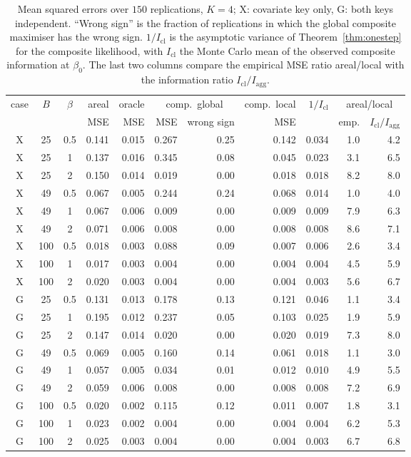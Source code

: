 \documentclass[11pt]{article}
\theoremstyle{definition}
\newcommand{\agg}{\mathrm{agg}}
\begin{document}
\begin{table}[t]\centering\footnotesize
\begin{tabular}{ccc rrr rr r rr}\toprule
case & $B$ & $\beta$ & areal & oracle & \multicolumn{2}{c}{comp.\ global} & comp.\ local & $1/I_{\mathrm{cl}}$ & \multicolumn{2}{c}{areal/local}\\
 & & & MSE & MSE & MSE & wrong sign & MSE & & emp. & $I_{\mathrm{cl}}/I_\agg$\\\midrule
X & 25 & 0.5 & 0.141 & 0.015 & 0.267 & 0.25 & 0.142 & 0.034 & 1.0 & 4.2\\
X & 25 & 1   & 0.137 & 0.016 & 0.345 & 0.08 & 0.045 & 0.023 & 3.1 & 6.5\\
X & 25 & 2   & 0.150 & 0.014 & 0.019 & 0.00 & 0.018 & 0.018 & 8.2 & 8.0\\
X & 49 & 0.5 & 0.067 & 0.005 & 0.244 & 0.24 & 0.068 & 0.014 & 1.0 & 4.0\\
X & 49 & 1   & 0.067 & 0.006 & 0.009 & 0.00 & 0.009 & 0.009 & 7.9 & 6.3\\
X & 49 & 2   & 0.071 & 0.006 & 0.008 & 0.00 & 0.008 & 0.008 & 8.6 & 7.1\\
X & 100 & 0.5 & 0.018 & 0.003 & 0.088 & 0.09 & 0.007 & 0.006 & 2.6 & 3.4\\
X & 100 & 1   & 0.017 & 0.003 & 0.004 & 0.00 & 0.004 & 0.004 & 4.5 & 5.9\\
X & 100 & 2   & 0.020 & 0.003 & 0.004 & 0.00 & 0.004 & 0.003 & 5.6 & 6.7\\\midrule
G & 25 & 0.5 & 0.131 & 0.013 & 0.178 & 0.13 & 0.121 & 0.046 & 1.1 & 3.4\\
G & 25 & 1   & 0.195 & 0.012 & 0.237 & 0.05 & 0.103 & 0.025 & 1.9 & 5.9\\
G & 25 & 2   & 0.147 & 0.014 & 0.020 & 0.00 & 0.020 & 0.019 & 7.3 & 8.0\\
G & 49 & 0.5 & 0.069 & 0.005 & 0.160 & 0.14 & 0.061 & 0.018 & 1.1 & 3.0\\
G & 49 & 1   & 0.057 & 0.005 & 0.034 & 0.01 & 0.012 & 0.010 & 4.9 & 5.5\\
G & 49 & 2   & 0.059 & 0.006 & 0.008 & 0.00 & 0.008 & 0.008 & 7.2 & 6.9\\
G & 100 & 0.5 & 0.020 & 0.002 & 0.115 & 0.12 & 0.011 & 0.007 & 1.8 & 3.1\\
G & 100 & 1   & 0.023 & 0.002 & 0.004 & 0.00 & 0.004 & 0.004 & 6.2 & 5.3\\
G & 100 & 2   & 0.025 & 0.003 & 0.004 & 0.00 & 0.004 & 0.003 & 6.7 & 6.8\\\bottomrule
\end{tabular}
\caption{Mean squared errors over $150$ replications, $K=4$; X: covariate key only, G: both keys independent. ``Wrong sign'' is the fraction of replications in which the global composite maximiser has the wrong sign. $1/I_{\mathrm{cl}}$ is the asymptotic variance of Theorem~\ref{thm:onestep} for the composite likelihood, with $I_{\mathrm{cl}}$ the Monte Carlo mean of the observed composite information at $\beta_0$. The last two columns compare the empirical MSE ratio areal/local with the information ratio $I_{\mathrm{cl}}/I_\agg$.}
\label{tab:estimators}
\end{table}
\end{document}
